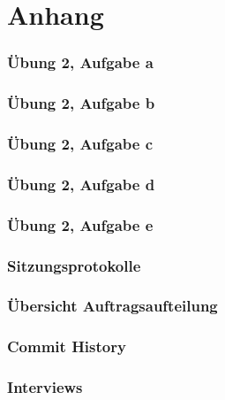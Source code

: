 \chapter*{Anhang}
\label{sec:Anhang}


\subsection*{Übung 2, Aufgabe a}
\subsection*{Übung 2, Aufgabe b}
\subsection*{Übung 2, Aufgabe c}
\subsection*{Übung 2, Aufgabe d}
\subsection*{Übung 2, Aufgabe e}
\subsection*{Sitzungsprotokolle}
\subsection*{Übersicht Auftragsaufteilung}
\subsection*{Commit History}
\subsection*{Interviews}
\label{sec_Interviews}

